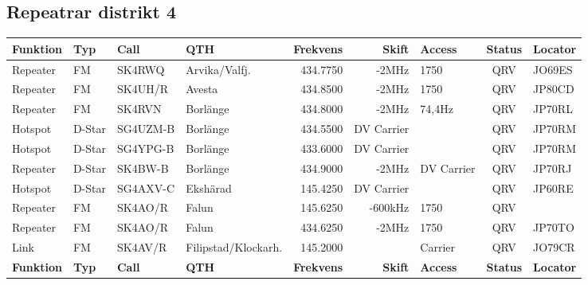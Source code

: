 \begin{landscape}
\subsection{Repeatrar distrikt 4}
\footnotesize
\begin{longtable}{llllrrlcl}
	\textbf{Funktion} & \textbf{Typ} & \textbf{Call} & \textbf{QTH}        & \textbf{Frekvens} & \textbf{Skift} & \textbf{Access} & \textbf{Status} & \textbf{Locator} \\ \hline
	Repeater          & FM           & SK4RWQ        & Arvika/Valfj.       &          434.7750 &          -2MHz & 1750            &       QRV       & JO69ES           \\
	Repeater          & FM           & SK4UH/R       & Avesta              &          434.8500 &          -2MHz & 1750            &       QRV       & JP80CD           \\
	Repeater          & FM           & SK4RVN        & Borlänge            &          434.8000 &          -2MHz & 74,4Hz          &       QRV       & JP70RL           \\
	Hotspot           & D-Star       & SG4UZM-B      & Borlänge            &          434.5500 &     DV Carrier &                 &       QRV       & JP70RM           \\
	Hotspot           & D-Star       & SG4YPG-B      & Borlänge            &          433.6000 &     DV Carrier &                 &       QRV       & JP70RM           \\
	Repeater          & D-Star       & SK4BW-B       & Borlänge            &          434.9000 &          -2MHz & DV Carrier      &       QRV       & JP70RJ           \\
	Hotspot           & D-Star       & SG4AXV-C      & Ekshärad            &          145.4250 &     DV Carrier &                 &       QRV       & JP60RE           \\
	Repeater          & FM           & SK4AO/R       & Falun               &          145.6250 &        -600kHz & 1750            &       QRV       &  \\
	Repeater          & FM           & SK4AO/R       & Falun               &          434.6250 &          -2MHz & 1750            &       QRV       & JP70TO           \\
	Link              & FM           & SK4AV/R       & Filipstad/Klockarh. &          145.2000 &                & Carrier         &       QRV       & JO79CR           \\
	\textbf{Funktion} & \textbf{Typ} & \textbf{Call} & \textbf{QTH}        & \textbf{Frekvens} & \textbf{Skift} & \textbf{Access} & \textbf{Status} & \textbf{Locator} \\ \hline

\end{longtable}
\end{landscape}
